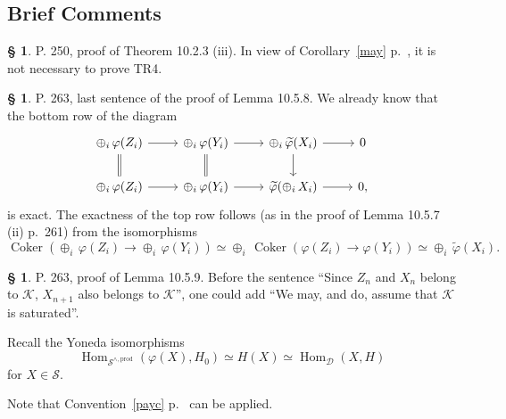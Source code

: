 \documentclass[12pt]{article}
\theoremstyle{remark}
\theoremstyle{definition}
\newtheorem{s}[thm]{\S}
\newcommand{\cc}{\mathcal}
\DeclareMathOperator{\Coker}{Coker}
\DeclareMathOperator{\Hom}{Hom}%
\begin{document}
\subsection{Brief Comments}
%
\begin{s} 
P. 250, proof of Theorem 10.2.3 (iii). In view of Corollary~\ref{may} p.~\pageref{may}, it is not necessary to prove TR4.
\end{s}
%
%
\begin{s} P. 263, last sentence of the proof of Lemma 10.5.8. We already know that the bottom row of the diagram 
$$
\begin{tikzcd}
\oplus_i\,\varphi(Z_i)\ar[equal]{d}\ar{r}&\oplus_i\,\varphi(Y_i)\ar[equal]{d}\ar{r}&\oplus_i\,\widetilde\varphi(X_i)\ar{d}\ar{r}&0\\ 
\oplus_i\,\varphi(Z_i)\ar{r}&\oplus_i\,\varphi(Y_i)\ar{r}&\widetilde\varphi(\oplus_i\,X_i)\ar{r}&0,
\end{tikzcd}
$$ 
is exact. The exactness of the top row follows (as in the proof of Lemma 10.5.7 (ii) p.~261) from the isomorphisms 
$$
\Coker(\oplus_i\,\varphi(Z_i)\to\oplus_i\,\varphi(Y_i))\simeq\oplus_i\,\Coker(\varphi(Z_i)\to\varphi(Y_i))\simeq\oplus_i\,\widetilde\varphi(X_i).
$$
\end{s}
%
%
\begin{s} P. 263, proof of Lemma 10.5.9. Before the sentence ``Since $Z_n$ and $X_n$ belong to $\cc K$, $X_{n+1}$ also belongs to $\cc K$'', one could add ``We may, and do, assume that $\cc K$ is saturated''.

Recall the Yoneda isomorphisms 
$$
\Hom_{\cc S^{\wedge,\text{prod}}}(\varphi(X),H_0)\simeq H(X)\simeq\Hom_{\cc D}(X,H)
$$ 
for $X\in\cc S$.

Note that Convention~\ref{payc} p.~\pageref{payc} can be applied.
\end{s}
%
%
\end{document}
